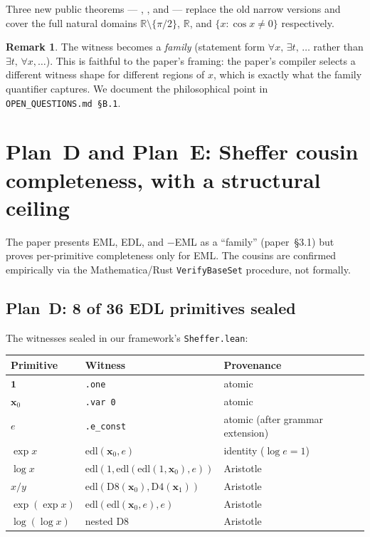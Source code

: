 \documentclass[11pt,a4paper]{article}
\newcommand{\edl}{\mathrm{edl}}
\theoremstyle{plain}
\theoremstyle{definition}
\newtheorem{remark}[theorem]{Remark}
\begin{document}
Three new public theorems --- ,
, and  ---
replace the old narrow versions and cover the full natural domains
$\mathbb{R}\setminus\{\pi/2\}$, $\mathbb{R}$, and
$\{x : \cos x \neq 0\}$ respectively.

\begin{remark}
The witness becomes a \emph{family} (statement form
$\forall x,\, \exists t,\, \dots$ rather than $\exists t,\, \forall x,
\dots$). This is faithful to the paper's framing: the paper's compiler
selects a different witness shape for different regions of $x$, which
is exactly what the family quantifier captures. We document the
philosophical point in
\texttt{OPEN\_QUESTIONS.md~\S B.1}.
\end{remark}

\section{Plan~D and Plan~E: Sheffer cousin completeness, with a
structural ceiling}
\label{sec:plan-d-e}

The paper presents EML, EDL, and $-\!$EML as a ``family''
(paper~\S3.1) but proves per-primitive completeness only for EML.
The cousins are confirmed empirically via the Mathematica/Rust
\texttt{VerifyBaseSet} procedure, not formally.

\subsection{Plan~D: 8 of 36 EDL primitives sealed}

The witnesses sealed in our framework's \texttt{Sheffer.lean}:

\begin{center}
\begin{tabular}{l l l}
\toprule
\textbf{Primitive} & \textbf{Witness} & \textbf{Provenance} \\
\midrule
$\mathbf{1}$ & \texttt{.one} & atomic \\
$\mathbf{x}_0$ & \texttt{.var 0} & atomic \\
$e$ & \texttt{.e\_const} & atomic (after grammar extension) \\
$\exp x$ & $\edl(\mathbf{x}_0, e)$ & identity ($\log e = 1$) \\
$\log x$ & $\edl(1, \edl(\edl(1, \mathbf{x}_0), e))$ & Aristotle \\
$x / y$ & $\edl(\mathrm{D8}(\mathbf{x}_0), \mathrm{D4}(\mathbf{x}_1))$ & Aristotle \\
$\exp(\exp x)$ & $\edl(\edl(\mathbf{x}_0, e), e)$ & Aristotle \\
$\log(\log x)$ & nested D8 & Aristotle \\
\bottomrule
\end{tabular}
\end{center}
\end{document}
